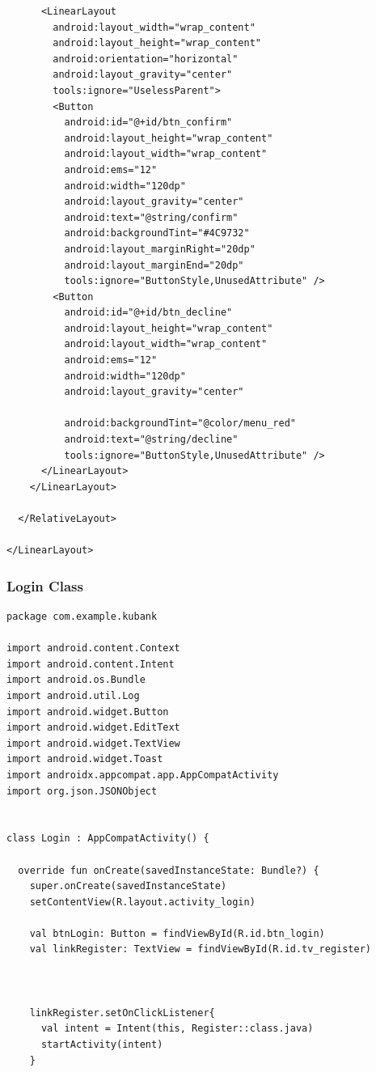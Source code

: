 \documentclass[11pt, a4paper]{article}
\begin{document}
\begin{appendices}
\begin{lstlisting}
      <LinearLayout
        android:layout_width="wrap_content"
        android:layout_height="wrap_content"
        android:orientation="horizontal"
        android:layout_gravity="center"
        tools:ignore="UselessParent">
        <Button
          android:id="@+id/btn_confirm"
          android:layout_height="wrap_content"
          android:layout_width="wrap_content"
          android:ems="12"
          android:width="120dp"
          android:layout_gravity="center"
          android:text="@string/confirm"
          android:backgroundTint="#4C9732"
          android:layout_marginRight="20dp"
          android:layout_marginEnd="20dp"
          tools:ignore="ButtonStyle,UnusedAttribute" />
        <Button
          android:id="@+id/btn_decline"
          android:layout_height="wrap_content"
          android:layout_width="wrap_content"
          android:ems="12"
          android:width="120dp"
          android:layout_gravity="center"

          android:backgroundTint="@color/menu_red"
          android:text="@string/decline"
          tools:ignore="ButtonStyle,UnusedAttribute" />
      </LinearLayout>
    </LinearLayout>

  </RelativeLayout>

</LinearLayout>
\end{lstlisting}
\subsubsection{Login Class}
\begin{lstlisting}
package com.example.kubank

import android.content.Context
import android.content.Intent
import android.os.Bundle
import android.util.Log
import android.widget.Button
import android.widget.EditText
import android.widget.TextView
import android.widget.Toast
import androidx.appcompat.app.AppCompatActivity
import org.json.JSONObject


class Login : AppCompatActivity() {

  override fun onCreate(savedInstanceState: Bundle?) {
    super.onCreate(savedInstanceState)
    setContentView(R.layout.activity_login)

    val btnLogin: Button = findViewById(R.id.btn_login)
    val linkRegister: TextView = findViewById(R.id.tv_register)



    linkRegister.setOnClickListener{
      val intent = Intent(this, Register::class.java)
      startActivity(intent)
    }


\end{lstlisting}
\end{appendices}
\end{document}
